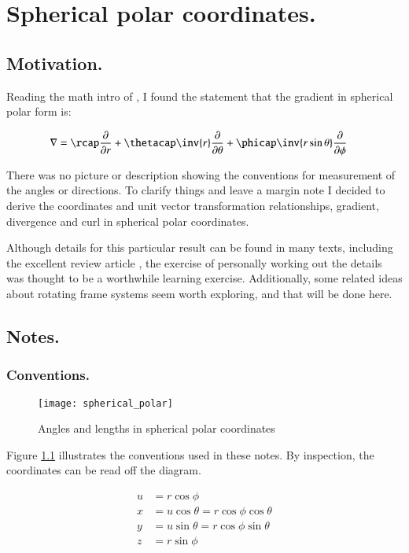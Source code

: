 \chapter{Spherical polar coordinates.}
\date{ Nov 13, 2008.  Last Revision: $Date: 2009/06/04 13:13:27 $ }

\section{Motivation. }

Reading the math intro of \cite{zeilik1998iaa}, I found the statement that the gradient in spherical polar form is:

\begin{align*}
\grad &= 
\rcap \PD{r}{}
+\thetacap \inv{r} \PD{\theta}{}
+\phicap \inv{r \sin\theta}\PD{\phi}{}
\end{align*}

There was no picture or description showing the conventions for measurement of the angles or directions.
To clarify things and leave a margin note I decided to derive the coordinates and unit vector transformation relationships,
gradient, divergence and curl in spherical polar coordinates.

Although details for this particular result can be found in many texts,
including the excellent review article \cite{fleischCoords}, the 
exercise of personally working out the details was thought to be
a worthwhile
learning exercise.  Additionally, some related ideas about rotating
frame systems seem worth exploring, and that will be done here.

\section{Notes. }
\subsection{Conventions. }

\begin{figure}[htp]
\centering
\texttt{[image: spherical\_polar]}
\caption{Angles and lengths in spherical polar coordinates}\label{fig:spherical_polar}
\end{figure}

Figure \ref{fig:spherical_polar} illustrates the conventions used in 
these notes.  By inspection, the coordinates can be read off the diagram.

\begin{align}\label{eqn:sphericalPolar:coordinates}
u &= r \cos\phi \\
x &= u \cos\theta = r \cos\phi \cos\theta \\
y &= u \sin\theta = r \cos\phi \sin\theta \\
z &= r \sin\phi
\end{align}

